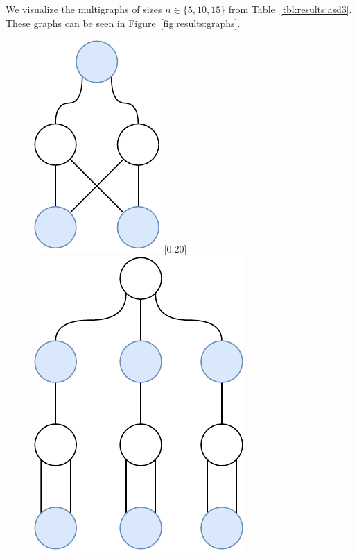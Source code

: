 We visualize the multigraphs of sizes $n \in \{5,10,15\}$ from Table~\ref{tbl:results:asd3}.
These graphs can be seen in Figure~\ref{fig:results:graphs}.

\begin{figure}[H]
    {
      \centering
      \includegraphics[scale=0.4]{diagrams/results_multigraph_n5_1.pdf}
    }
    \hfill
    [0.20\textwidth]
       {
      \centering
      \includegraphics[scale=0.4]{diagrams/results_multigraph_n10_1.pdf}
    }
    \hfill
       {
      \centering
}
\end{figure}
